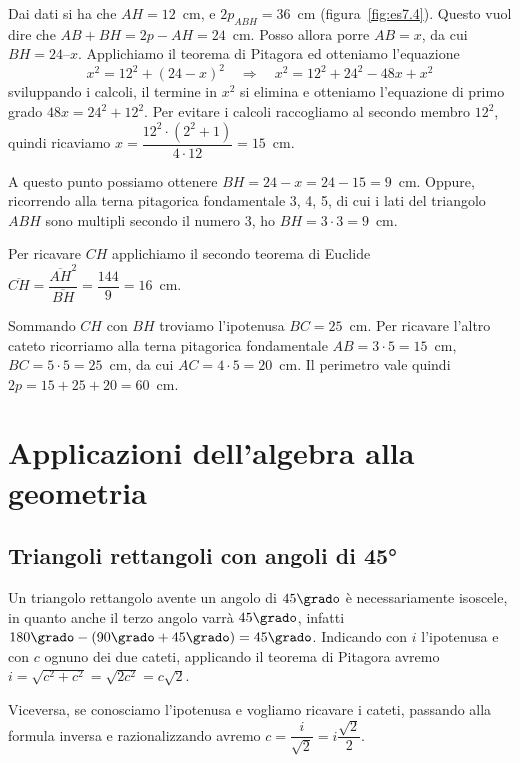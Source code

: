 \begin{exrig}
\begin{esempio}
Dai dati si ha che $AH = 12$~cm, e $2p_{ABH} = 36$~cm 
(figura~\ref{fig:es7.4}).
Questo vuol dire che $AB + BH = 2p - AH = 24$~cm. 
Posso allora porre $AB = x$, da cui $BH = 24 – x$.
Applichiamo il teorema di Pitagora ed otteniamo l'equazione
\[x^2 = 12^2 + (24 - x)^2 \quad\Rightarrow\quad x^2 = 12^2 + 24^2 - 
48x + x^2\]
sviluppando i calcoli, il termine in $x^2$ si elimina e otteniamo 
l'equazione di primo grado $48x = 24^2 + 12^2$.
Per evitare i calcoli raccogliamo al secondo membro $12^2$, quindi 
ricaviamo $x=\dfrac{12^2\cdot\left(2^2+1\right)}{4\cdot 12}=15$~cm.

A questo punto possiamo ottenere $BH = 24-x = 24-15 = 9$~cm. Oppure, 
ricorrendo alla terna pitagorica fondamentale 3, 4, 5, di cui i lati 
del triangolo $ABH$ sono multipli secondo il numero 3, ho $BH = 3 
\cdot 3 = 9$~cm.

Per ricavare $CH$ applichiamo il secondo teorema di Euclide 
$\overline{CH}=\dfrac{\overline{AH}^2}{\overline{BH}}=\dfrac{144}{9}
=16$~cm.

Sommando $CH$ con $BH$ troviamo l'ipotenusa $BC=25$~cm. Per ricavare 
l'altro cateto ricorriamo alla terna pitagorica fondamentale 
$AB=3\cdot 5=15$~cm, $BC=5\cdot 5=25$~cm, da cui $AC=4\cdot 5=20$~cm.
Il perimetro vale quindi $2p=15+25+20=60$~cm.
\end{esempio}
\end{exrig}

\section{Applicazioni dell'algebra alla 
geometria}\label{sect:applicazioni_algebra}

\subsection{Triangoli rettangoli con angoli di 45°}

\begin{wrapfigure}{r}{0.25\textwidth}
	\centering
\end{wrapfigure}
Un triangolo rettangolo avente un angolo di $45\grado$ è 
necessariamente isoscele, in quanto anche il terzo angolo varrà 
$45\grado$, infatti $180\grado - (90\grado+45\grado)=45\grado$.
Indicando con $i$ l'ipotenusa e con $c$ ognuno dei due cateti, 
applicando il teorema di Pitagora avremo 
$i=\sqrt{c^2+c^2}=\sqrt{2c^2}=c\sqrt{2}$.

Viceversa, se conosciamo l'ipotenusa e vogliamo ricavare i cateti, 
passando alla formula inversa e razionalizzando avremo 
$c=\dfrac{i}{\sqrt{2}}=i\dfrac{\sqrt{2}}{2}$.

